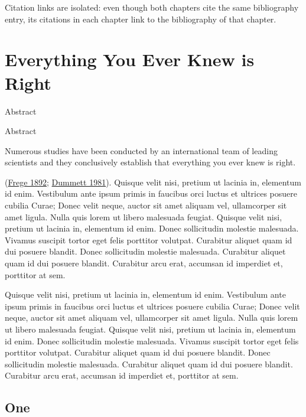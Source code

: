 \documentclass{scrbook}
\makeatletter
\def\@comingchapterauthor{} %
\def\@chapterauthor{} %
\newcommand{\chapterauthor}[1]{\def\@comingchapterauthor{#1}}
\newenvironment{abstract}{%
  \if@titlepage
    \titlepage
    \null\vfil
    \@beginparpenalty\@lowpenalty
    \if@abstrt
      \begin{center}
        \normalfont\sectfont\nobreak\abstractname
        \@endparpenalty\@M
      \end{center}
    \fi
  \else
    \if@twocolumn\if@abstrt
        \addsec*{\abstractname}
      \fi
    \else
      \if@abstrt
        \small
        \begin{center}
          {\normalfont\sectfont\nobreak\abstractname
            \vspace{-.5em}\vspace{\z@}}%
        \end{center}
      \fi
      \quotation
    \fi
  \fi
}{%
  \if@titlepage
    \par\vfil\null\endtitlepage
  \else
    \if@twocolumn\else\endquotation\fi
  \fi
}
\newcommand*\abstractname{Abstract}
\let\oldchapter\chapter
\renewcommand{\chapter}[2][]{%
   \clearpage%
   \let\@chapterauthor\@comingchapterauthor%
   \oldchapter[#1]{#2}%
}
\makeatother
\begin{document}
Citation links are isolated: even though both chapters cite the same
bibliography entry, its citations in each chapter link to the
bibliography of that chapter.

\chapterauthor{I.P. Freely}
\chapter[Everything is Right]{Everything You Ever Knew is Right}


\begin{abstract}
Numerous studies have been conducted by an international team of leading
scientists and they conclusively establish that everything you ever knew
is right.
\end{abstract}
%
%
(\protect\hyperlink{c2-ref-fregeUeberSinnUnd1892}{Frege 1892};
\protect\hyperlink{c2-ref-dummettFregePhilosophyLanguage1981}{Dummett
1981}). Quisque velit nisi, pretium ut lacinia in, elementum id enim.
Vestibulum ante ipsum primis in faucibus orci luctus et ultrices posuere
cubilia Curae; Donec velit neque, auctor sit amet aliquam vel,
ullamcorper sit amet ligula. Nulla quis lorem ut libero malesuada
feugiat. Quisque velit nisi, pretium ut lacinia in, elementum id enim.
Donec sollicitudin molestie malesuada. Vivamus suscipit tortor eget
felis porttitor volutpat. Curabitur aliquet quam id dui posuere blandit.
Donec sollicitudin molestie malesuada. Curabitur aliquet quam id dui
posuere blandit. Curabitur arcu erat, accumsan id imperdiet et,
porttitor at sem.

Quisque velit nisi, pretium ut lacinia in, elementum id enim. Vestibulum
ante ipsum primis in faucibus orci luctus et ultrices posuere cubilia
Curae; Donec velit neque, auctor sit amet aliquam vel, ullamcorper sit
amet ligula. Nulla quis lorem ut libero malesuada feugiat. Quisque velit
nisi, pretium ut lacinia in, elementum id enim. Donec sollicitudin
molestie malesuada. Vivamus suscipit tortor eget felis porttitor
volutpat. Curabitur aliquet quam id dui posuere blandit. Donec
sollicitudin molestie malesuada. Curabitur aliquet quam id dui posuere
blandit. Curabitur arcu erat, accumsan id imperdiet et, porttitor at
sem.

\hypertarget{c2-c2-one}{%
\section{One}\label{c2-c2-one}}
\end{document}
